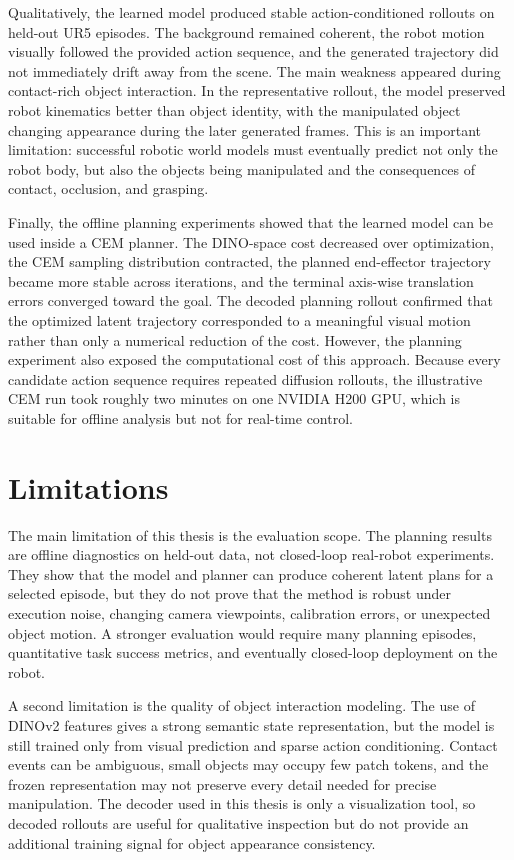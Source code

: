 \documentclass[12pt]{report}
\begin{document}
Qualitatively, the learned model produced stable action-conditioned rollouts on held-out UR5 episodes. The background remained coherent, the robot motion visually followed the provided action sequence, and the generated trajectory did not immediately drift away from the scene. The main weakness appeared during contact-rich object interaction. In the representative rollout, the model preserved robot kinematics better than object identity, with the manipulated object changing appearance during the later generated frames. This is an important limitation: successful robotic world models must eventually predict not only the robot body, but also the objects being manipulated and the consequences of contact, occlusion, and grasping.

Finally, the offline planning experiments showed that the learned model can be used inside a CEM planner. The DINO-space cost decreased over optimization, the CEM sampling distribution contracted, the planned end-effector trajectory became more stable across iterations, and the terminal axis-wise translation errors converged toward the goal. The decoded planning rollout confirmed that the optimized latent trajectory corresponded to a meaningful visual motion rather than only a numerical reduction of the cost. However, the planning experiment also exposed the computational cost of this approach. Because every candidate action sequence requires repeated diffusion rollouts, the illustrative CEM run took roughly two minutes on one NVIDIA H200 GPU, which is suitable for offline analysis but not for real-time control.

\section{Limitations}
The main limitation of this thesis is the evaluation scope. The planning results are offline diagnostics on held-out data, not closed-loop real-robot experiments. They show that the model and planner can produce coherent latent plans for a selected episode, but they do not prove that the method is robust under execution noise, changing camera viewpoints, calibration errors, or unexpected object motion. A stronger evaluation would require many planning episodes, quantitative task success metrics, and eventually closed-loop deployment on the robot.

A second limitation is the quality of object interaction modeling. The use of DINOv2 features gives a strong semantic state representation, but the model is still trained only from visual prediction and sparse action conditioning. Contact events can be ambiguous, small objects may occupy few patch tokens, and the frozen representation may not preserve every detail needed for precise manipulation. The decoder used in this thesis is only a visualization tool, so decoded rollouts are useful for qualitative inspection but do not provide an additional training signal for object appearance consistency.
\end{document}
